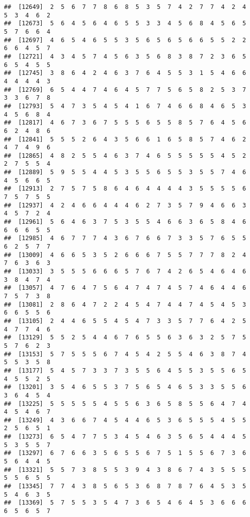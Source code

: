 \documentclass[
]{book}
\begin{document}
\begin{verbatim}
##  [12649]  2  5  6  7  7  8  6  8  5  3  5  7  4  2  7  7  4  2  4  5  3  4  6  2
##  [12673]  5  6  4  5  6  4  6  5  5  3  3  4  5  6  8  4  5  6  5  5  7  6  6  4
##  [12697]  4  6  5  4  6  5  5  3  5  6  5  6  5  6  6  5  5  2  2  6  6  4  5  7
##  [12721]  4  3  4  5  7  4  5  6  3  5  6  8  3  8  7  2  3  6  5  6  5  4  5  5
##  [12745]  3  8  6  4  2  4  6  3  7  6  4  5  5  3  1  5  4  6  6  4  4  4  4  3
##  [12769]  6  5  4  4  7  4  6  4  5  7  7  5  6  5  8  2  5  3  7  3  3  6  7  8
##  [12793]  5  4  7  3  5  4  5  4  1  6  7  4  6  6  8  4  6  5  3  4  5  6  8  4
##  [12817]  4  6  7  3  6  7  5  5  5  6  5  5  8  5  7  6  4  5  6  6  2  4  8  6
##  [12841]  5  5  5  2  6  4  3  5  6  6  1  6  5  8  5  7  4  6  2  4  7  4  9  6
##  [12865]  4  8  2  5  5  4  6  3  7  4  6  5  5  5  5  5  4  5  2  2  7  5  5  4
##  [12889]  5  9  5  5  4  4  5  3  5  5  6  5  5  3  5  5  7  4  6  4  5  6  6  5
##  [12913]  2  7  5  7  5  8  6  4  6  4  4  4  4  3  5  5  5  5  6  7  5  7  5  5
##  [12937]  4  2  4  6  6  4  4  4  6  2  7  3  5  7  9  4  6  6  3  4  5  7  2  4
##  [12961]  5  6  4  6  3  7  5  3  5  5  4  6  6  3  6  5  8  4  6  6  6  6  5  5
##  [12985]  4  6  7  7  7  4  3  6  7  6  6  7  3  3  5  7  6  5  5  6  2  5  7  7
##  [13009]  4  6  6  5  3  5  2  6  6  6  7  5  5  7  7  7  8  2  4  7  6  3  6  3
##  [13033]  3  5  5  5  6  6  6  5  7  6  7  4  2  6  5  4  6  4  6  3  8  4  7  4
##  [13057]  4  7  6  4  7  5  6  4  7  4  7  4  5  7  4  6  4  4  6  7  5  7  3  8
##  [13081]  2  8  6  4  7  2  2  4  5  4  7  4  4  7  4  5  4  5  3  6  6  5  5  6
##  [13105]  2  4  4  6  5  5  4  5  4  7  3  3  5  7  7  6  4  2  5  4  7  7  4  6
##  [13129]  5  5  2  5  4  4  6  7  6  5  5  6  3  6  3  2  5  7  5  5  7  6  2  3
##  [13153]  5  7  5  5  5  6  7  4  5  4  2  5  5  4  6  3  8  7  4  5  5  3  5  8
##  [13177]  5  4  5  7  3  3  7  3  5  5  6  4  5  5  3  5  5  6  5  4  5  5  2  5
##  [13201]  3  5  4  6  5  5  3  7  5  6  5  4  6  5  3  3  5  5  6  3  6  4  5  4
##  [13225]  5  5  5  5  5  4  5  5  6  3  6  5  8  5  5  6  4  7  4  4  5  4  6  7
##  [13249]  4  3  6  6  7  4  5  4  4  6  5  3  6  5  5  5  4  5  5  2  5  6  5  1
##  [13273]  6  5  4  7  7  5  3  4  5  4  6  3  5  6  5  4  4  4  5  5  3  5  5  7
##  [13297]  6  7  6  6  3  5  6  5  5  6  7  5  1  5  5  6  7  3  6  5  6  4  4  5
##  [13321]  5  5  7  3  8  5  5  3  9  4  3  8  6  7  4  3  5  5  5  5  5  6  5  5
##  [13345]  7  7  4  3  8  5  6  5  3  6  8  7  8  7  6  4  5  3  5  5  4  6  3  5
##  [13369]  5  7  5  5  3  5  4  7  3  6  5  4  6  4  5  3  6  6  6  6  5  6  5  7

\end{verbatim}
\end{document}
